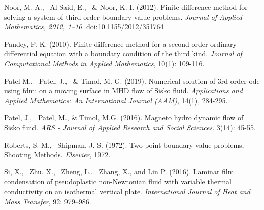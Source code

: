 \documentclass[12pt]{report}
\begin{document}
\begin{description}
		
		\item Noor, M. A., ~Al-Said, E., ~\& Noor, K. I. (2012). Finite difference method for solving a system of third-order boundary value problems. \textit{Journal of Applied Mathematics, 2012, 1–10}. doi:10.1155/2012/351764
		
		
		\item Pandey, P. K. (2010). Finite difference method for a second-order ordinary differential equation with a boundary condition of the third kind. \textit{Journal of Computational Methods in Applied Mathematics}, 10(1): 109-116.
		
		
		\item Patel M., ~Patel, J., ~\& Timol, M. G. (2019). Numerical solution of 3rd order ode using fdm: on a moving surface in MHD flow of Sisko fluid. \textit{Applications and Applied Mathematics: An International Journal (AAM)}, 14(1), 284-295.
		
		
		\item Patel, J., ~Patel, M., \& Timol, M.G. (2016). Magneto hydro dynamic flow of Sisko fluid. \textit{ARS - Journal of Applied Research and Social Sciences}. 3(14): 45-55.
		
		
		\item Roberts, S. M., ~Shipman, J. S. (1972). Two-point boundary value problems, Shooting Methods. \textit{Elsevier}, 1972.
		
		
		\item Si, X., ~Zhu, X., ~Zheng, L., ~Zhang, X., and Lin P. (2016). Laminar film condensation of pseudoplastic non-Newtonian fluid with variable thermal conductivity on an isothermal vertical plate. \textit{International Journal of Heat and Mass Transfer}, 92: 979–986.
		
		
	\end{description}
\end{document}
